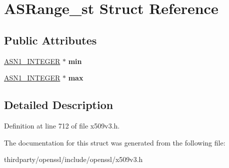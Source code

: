 \hypertarget{struct_a_s_range__st}{}\section{A\+S\+Range\+\_\+st Struct Reference}
\label{struct_a_s_range__st}
\subsection*{Public Attributes}
\begin{DoxyCompactItemize}
\item 
\mbox{\label{struct_a_s_range__st_a28c7c20c67a7a239de72908a857f83f4}} 
\hyperlink{structasn1__string__st}{A\+S\+N1\+\_\+\+I\+N\+T\+E\+G\+ER} $\ast$ {\bfseries min}
\item 
\mbox{\label{struct_a_s_range__st_a1a433ce24ae5c115b8fb4f4c5d099def}} 
\hyperlink{structasn1__string__st}{A\+S\+N1\+\_\+\+I\+N\+T\+E\+G\+ER} $\ast$ {\bfseries max}
\end{DoxyCompactItemize}


\subsection{Detailed Description}


Definition at line 712 of file x509v3.\+h.



The documentation for this struct was generated from the following file\+:\begin{DoxyCompactItemize}
\item 
thirdparty/openssl/include/openssl/x509v3.\+h\end{DoxyCompactItemize}
